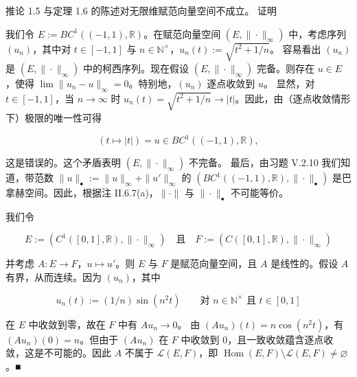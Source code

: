 \begin{remark}

\begin{items}
\item

推论 1.5 与定理 1.6 的陈述对无限维赋范向量空间不成立。
证明

\begin{subitems}
\item

我们令 $ E := BC^{1}((-1, 1), \mathbb{R}) $。在赋范向量空间 $ (E, \|\cdot\|_{\infty}) $ 中，考虑序列 $ (u_{n}) $，其中对 $ t \in [-1, 1] $ 与 $ n \in \mathbb{N}^{\times} $，$ u_{n}(t) := \sqrt{t^{2} + 1/n} $。
容易看出 $ (u_{n}) $ 是 $ (E, \|\cdot\|_{\infty}) $ 中的柯西序列。现在假设 $ (E, \|\cdot\|_{\infty}) $ 完备。则存在 $ u \in E $，使得 $ \lim \|u_{n} - u\|_{\infty} = 0 $。特别地，$ (u_{n}) $ 逐点收敛到 $ u $。
显然，对 $ t \in [-1, 1] $，当 $ n \to \infty $ 时 $ u_{n}(t) = \sqrt{t^{2} + 1/n} \to |t| $。因此，由（逐点收敛情形下）极限的唯一性可得

\[
(t \mapsto |t|) = u \in BC^{1}((-1, 1), \mathbb{R}) ,
\]

这是错误的。这个矛盾表明 $ (E, \|\cdot\|_{\infty}) $ 不完备。
最后，由习题 V.2.10 我们知道，带范数 $ \|u\|_{\bullet} := \|u\|_{\infty} + \|u'\|_{\infty} $ 的 $ (BC^{1}((-1, 1), \mathbb{R}), \|\cdot\|_{\bullet}) $ 是巴拿赫空间。因此，根据注 II.6.7(a)，$ \|\cdot\| $ 与 $ \|\cdot\|_{\bullet} $ 不可能等价。

\item

我们令

\[
E := (C^{1}([0, 1], \mathbb{R}), \|\cdot\|_{\infty}) \quad \text{且} \quad F := (C([0, 1], \mathbb{R}), \|\cdot\|_{\infty})
\]

并考虑 $ A : E \to F $，$ u \mapsto u' $。则 $ E $ 与 $ F $ 是赋范向量空间，且 $ A $ 是线性的。假设 $ A $ 有界，从而连续。因为 $ (u_{n}) $，其中

\[
u_{n}(t) := (1/n)\sin(n^{2}t) \qquad \text{对 } n \in \mathbb{N}^{\times} \text{ 且 } t \in [0, 1]
\]

在 $ E $ 中收敛到零，故在 $ F $ 中有 $ Au_{n} \to 0 $。
由 $ (Au_{n})(t) = n\cos(n^{2}t) $，有 $ (Au_{n})(0) = n $。但由于 $ (Au_{n}) $ 在 $ F $ 中收敛到 0，且一致收敛蕴含逐点收敛，这是不可能的。因此 $ A $ 不属于 $ \mathcal{L}(E, F) $，即 $ \operatorname{Hom}(E, F)\setminus\mathcal{L}(E, F) \ne \varnothing $。\nobreak\hspace{0.35em}■

\end{subitems}


\end{items}
\end{remark}

